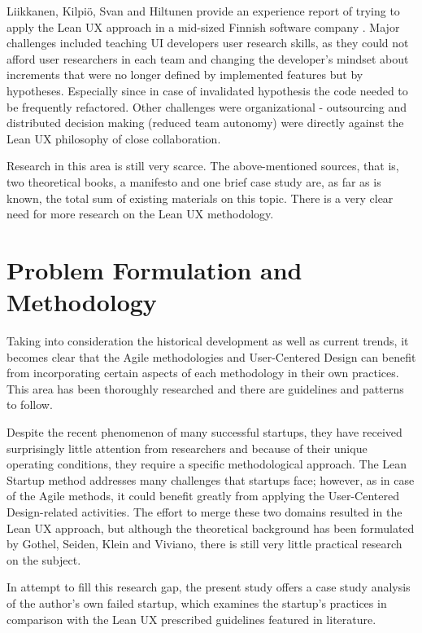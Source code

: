 \documentclass{article}
\begin{document}
Liikkanen, Kilpiö, Svan and Hiltunen provide an experience report of trying to apply the Lean UX approach in a mid-sized Finnish software company \cite{liikkanen2014lean}. Major challenges included teaching UI developers user research skills, as they could not afford user researchers in each team and changing the developer's mindset about increments that were no longer defined by implemented features but by hypotheses. Especially since in case of invalidated hypothesis the code needed to be frequently refactored. Other challenges were organizational - outsourcing and distributed decision making (reduced team autonomy) were directly against the Lean UX philosophy of close collaboration.

Research in this area is still very scarce. The above-mentioned sources, that is, two theoretical books, a manifesto and one brief case study are, as far as is known, the total sum of existing materials on this topic. There is a very clear need for more research on the Lean UX methodology.

\section{Problem Formulation and Methodology}
\label{sec:probl-form-meth}
Taking into consideration the historical development as well as current trends, it becomes clear that the Agile methodologies and User-Centered Design can benefit from incorporating certain aspects of each methodology in their own practices. This area has been thoroughly researched and there are guidelines and patterns to follow.

Despite the recent phenomenon of many successful startups, they have received surprisingly little attention from researchers and because of their unique operating conditions, they require a specific methodological approach. The Lean Startup method addresses many challenges that startups face; however, as in case of the Agile methods, it could benefit greatly from applying the User-Centered Design-related activities. The effort to merge these two domains resulted in the Lean UX approach, but although the theoretical background has been formulated by Gothel, Seiden, Klein and Viviano, there is still very little practical research on the subject.

In attempt to fill this research gap, the present study offers a case study analysis of the author's own failed startup, which examines the startup's practices in comparison with the Lean UX prescribed guidelines featured in literature.
\end{document}
